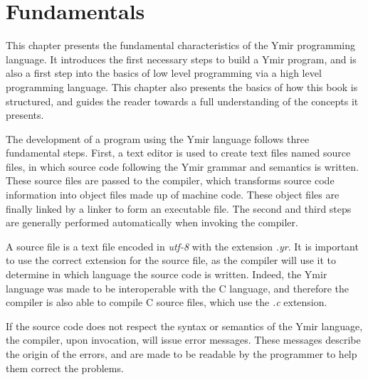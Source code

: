\chapter{Fundamentals}
\nopagecolor{}
\label{chap:chap1}
\vspace{-50pt}%

This chapter presents the fundamental characteristics of the Ymir programming language. It introduces the first necessary steps to build a Ymir program, and is also a first step into the basics of low level programming via a high level programming language. This chapter also presents the basics of how this book is structured, and guides the reader towards a full understanding of the concepts it presents.

\minitoc%

The development of a program using the Ymir language follows three fundamental
steps. First, a text editor is used to create text files named source files, in
which source code following the Ymir grammar and semantics is written. These
source files are passed to the compiler, which transforms source code
information into object files made up of machine code. These object files are
finally linked by a linker to form an executable file. The second and third
steps are generally performed automatically when invoking the compiler.


\vfill%
\pagebreak%
          
A source file is a text file encoded in \textit{utf-8} with the
extension \textit{.yr}. It is important to use the correct extension for the
source file, as the compiler will use it to determine in which language the
source code is written. Indeed, the Ymir language was made to be interoperable
with the C language, and therefore the compiler is also able to compile C source
files, which use the \textit{.c} extension.

If the source code does not respect the syntax or semantics of the Ymir
language, the compiler, upon invocation, will issue error messages. These
messages describe the origin of the errors, and are made to be readable by the
programmer to help them correct the problems.
\vfill%
      





